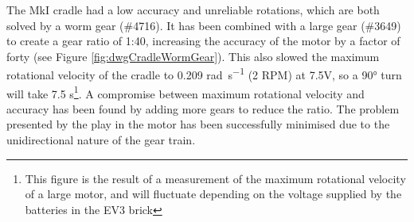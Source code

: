 \documentclass{report}
\newcommand{\legopiece}[1]{(\##1)}
\begin{document}
	The MkI cradle had a low accuracy and unreliable rotations, which are both solved by a worm gear \legopiece{4716}. It has been combined with a large gear \legopiece{3649} to create a gear ratio of 1:40, increasing the accuracy of the motor by a factor of forty (see Figure \ref{fig:dwgCradleWormGear}). This also slowed the maximum rotational velocity of the cradle to 0.209 \si{\radian\per\second} (2 RPM) at 7.5\si{\volt}, so a \ang{90} turn will take 7.5 \si{\second}\footnote{This figure is the result of a measurement of the maximum rotational velocity of a large motor, and will fluctuate depending on the voltage supplied by the batteries in the EV3 brick}. A compromise between maximum rotational velocity and accuracy has been found by adding more gears to reduce the ratio. The problem presented by the play in the motor has been successfully minimised due to the unidirectional nature of the gear train.
	
\end{document}
